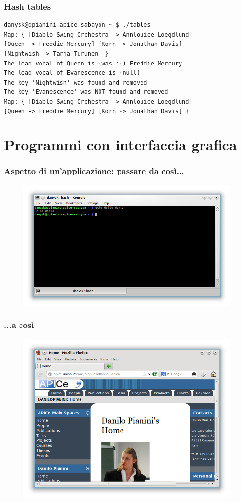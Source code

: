 \documentclass{beamer}
\begin{document}
\begin{frame}[fragile]
\frametitle{Hash tables}
\begin{verbatim}
danysk@dpianini-apice-sabayon ~ $ ./tables 
Map: { [Diablo Swing Orchestra -> Annlouice Loegdlund]
[Queen -> Freddie Mercury] [Korn -> Jonathan Davis]
[Nightwish -> Tarja Turunen] }
The lead vocal of Queen is (was :() Freddie Mercury
The lead vocal of Evanescence is (null)
The key 'Nightwish' was found and removed
The key 'Evanescence' was NOT found and removed
Map: { [Diablo Swing Orchestra -> Annlouice Loegdlund]
[Queen -> Freddie Mercury] [Korn -> Jonathan Davis] }
\end{verbatim}
\end{frame}


\section{Programmi con interfaccia grafica}

\begin{frame}
\frametitle{Aspetto di un'applicazione: passare da così...}
\begin{figure}
 \includegraphics[width=0.99\columnwidth]{img/console}
\end{figure}
\end{frame}

\begin{frame}
\frametitle{...a così}
\begin{figure}
 \includegraphics[width=0.99\columnwidth]{img/gui}
\end{figure}
\end{frame}
\end{document}
